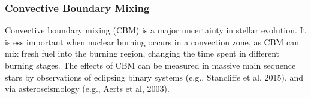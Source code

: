{\color{purple}
\subsubsection{Convective Boundary Mixing}
}

Convective boundary mixing (CBM) is a major uncertainty in stellar evolution. It is ess important when nuclear burning occurs in a convection zone, as CBM can mix fresh fuel into the burning region, changing the time spent in different burning stages. The effects of CBM can be measured in massive main sequence stars by observations of eclipsing binary systems (e.g., Stancliffe et al, 2015), and via asteroseismology (e.g., Aerts et al, 2003).



